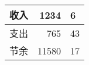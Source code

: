 \documentclass[nofonts]{ctexart}
\begin{document}
\begin{tabular}{|c|r@{.}l|}
	\hline
	收入	& 1234	& 6		\\
	\hline
	支出	& 765	& 43	\\
	节余	& 11580	& 17	\\
	\hline
\end{tabular}
\end{document}

